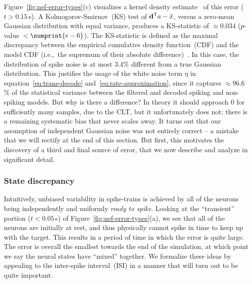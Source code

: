 Figure~\ref{fig:nef-error-types}(c) visualizes a kernel density estimate~\citep[KDE;][]{michael_waskom_2015_19108} of this error ($t > 0.15$\,s).
A Kolmogorov-Smirnov~(KS) test of ${\mathbf{d}}^\mathsf{T}a - \hat{x}$, versus a zero-mean Gaussian distribution with equal variance, produces a KS-statistic of $\approx 0.034$ ($p$-value~$< \numprint{e-6}$).
The KS-statistic is defined as the maximal discrepancy between the empirical cumulative density function~(CDF) and the model CDF (i.e.,~the supremum of their absolute difference)~\citep{massey1951kolmogorov}.
In this case, the distribution of spike noise is at most $3.4$\% different from a true Gaussian distribution.
This justifies the usage of the white noise term $\eta$ in equation~\ref{eq:trans-decode} and~\ref{eq:rate-approximation}, since it captures $\approx 96.6$\% of the statistical variance between the filtered and decoded spiking and non-spiking models.
But why is there a difference?
In theory it should approach $0$ for sufficiently many samples, due to the CLT, but it unfortunately does not; there is a remaining systematic bias that never scales away.
It turns out that our assumption of independent Gaussian noise was not entirely correct -- a mistake that we will rectify at the end of this section.
But first, this motivates the discovery of a third and final source of error, that we now describe and analyze in significant detail.

\subsubsection{State discrepancy}

Intuitively, unbiased variability in spike-trains is achieved by all of the neurons being independently and uniformly \emph{ready to spike}.
Looking at the ``transient'' portion ($t < 0.05$\,s) of Figure~\ref{fig:nef-error-types}(a), we see that all of the neurons are initially at rest, and thus physically cannot spike in time to keep up with the target.
This results in a period of time in which the error is quite large.
The error is overall the smallest towards the end of the simulation, at which point we say the neural states have ``mixed'' together.
We formalize these ideas by appealing to the inter-spike interval~(ISI) in a manner that will turn out to be quite important.

